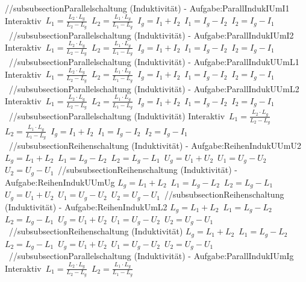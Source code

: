 //subsubsection{Parallelschaltung (Induktivität) - Aufgabe:ParallIndukIUmI1} 
Interaktiv\ 
$ L_{1}  = \frac{L_{2} \cdot L_{g} }{L_{2} -L_{g} } $\ 
$ L_{2}  = \frac{L_{1} \cdot L_{g} }{L_{1} -L_{g} } $\ 
$ I_{g}  = I_{1}  + I_{2} $\ 
$ I_{1}  = I_{g}  - I_{2} $\ 
$ I_{2}  = I_{g}  - I_{1} $\ 
//subsubsection{Parallelschaltung (Induktivität) - Aufgabe:ParallIndukIUmI2} 
Interaktiv\ 
$ L_{1}  = \frac{L_{2} \cdot L_{g} }{L_{2} -L_{g} } $\ 
$ L_{2}  = \frac{L_{1} \cdot L_{g} }{L_{1} -L_{g} } $\ 
$ I_{g}  = I_{1}  + I_{2} $\ 
$ I_{1}  = I_{g}  - I_{2} $\ 
$ I_{2}  = I_{g}  - I_{1} $\ 
//subsubsection{Parallelschaltung (Induktivität) - Aufgabe:ParallIndukUUmL1} 
Interaktiv\ 
$ L_{1}  = \frac{L_{2} \cdot L_{g} }{L_{2} -L_{g} } $\ 
$ L_{2}  = \frac{L_{1} \cdot L_{g} }{L_{1} -L_{g} } $\ 
$ I_{g}  = I_{1}  + I_{2} $\ 
$ I_{1}  = I_{g}  - I_{2} $\ 
$ I_{2}  = I_{g}  - I_{1} $\ 
//subsubsection{Parallelschaltung (Induktivität) - Aufgabe:ParallIndukUUmL2} 
Interaktiv\ 
$ L_{1}  = \frac{L_{2} \cdot L_{g} }{L_{2} -L_{g} } $\ 
$ L_{2}  = \frac{L_{1} \cdot L_{g} }{L_{1} -L_{g} } $\ 
$ I_{g}  = I_{1}  + I_{2} $\ 
$ I_{1}  = I_{g}  - I_{2} $\ 
$ I_{2}  = I_{g}  - I_{1} $\ 
//subsubsection{Parallelschaltung (Induktivität)} 
Interaktiv\ 
$ L_{1}  = \frac{L_{2} \cdot L_{g} }{L_{2} -L_{g} } $\ 
$ L_{2}  = \frac{L_{1} \cdot L_{g} }{L_{1} -L_{g} } $\ 
$ I_{g}  = I_{1}  + I_{2} $\ 
$ I_{1}  = I_{g}  - I_{2} $\ 
$ I_{2}  = I_{g}  - I_{1} $\ 
//subsubsection{Reihenschaltung (Induktivität) - Aufgabe:ReihenIndukUUmU2} 
$ L_{g}  = L_{1}  + L_{2} $\ 
$ L_{1}  = L_{g}  - L_{2} $\ 
$ L_{2}  = L_{g}  - L_{1} $\ 
$ U_{g}  = U_{1}  + U_{2} $\ 
$ U_{1}  = U_{g}  - U_{2} $\ 
$ U_{2}  = U_{g}  - U_{1} $\ 
//subsubsection{Reihenschaltung (Induktivität) - Aufgabe:ReihenIndukUUmUg} 
$ L_{g}  = L_{1}  + L_{2} $\ 
$ L_{1}  = L_{g}  - L_{2} $\ 
$ L_{2}  = L_{g}  - L_{1} $\ 
$ U_{g}  = U_{1}  + U_{2} $\ 
$ U_{1}  = U_{g}  - U_{2} $\ 
$ U_{2}  = U_{g}  - U_{1} $\ 
//subsubsection{Reihenschaltung (Induktivität) - Aufgabe:ReihenIndukUmL2} 
$ L_{g}  = L_{1}  + L_{2} $\ 
$ L_{1}  = L_{g}  - L_{2} $\ 
$ L_{2}  = L_{g}  - L_{1} $\ 
$ U_{g}  = U_{1}  + U_{2} $\ 
$ U_{1}  = U_{g}  - U_{2} $\ 
$ U_{2}  = U_{g}  - U_{1} $\ 
//subsubsection{Reihenschaltung (Induktivität)} 
$ L_{g}  = L_{1}  + L_{2} $\ 
$ L_{1}  = L_{g}  - L_{2} $\ 
$ L_{2}  = L_{g}  - L_{1} $\ 
$ U_{g}  = U_{1}  + U_{2} $\ 
$ U_{1}  = U_{g}  - U_{2} $\ 
$ U_{2}  = U_{g}  - U_{1} $\ 
//subsubsection{Parallelschaltung (Induktivität) - Aufgabe:ParallIndukIUmIg} 
Interaktiv\ 
$ L_{1}  = \frac{L_{2} \cdot L_{g} }{L_{2} -L_{g} } $\ 
$ L_{2}  = \frac{L_{1} \cdot L_{g} }{L_{1} -L_{g} } $\ 
